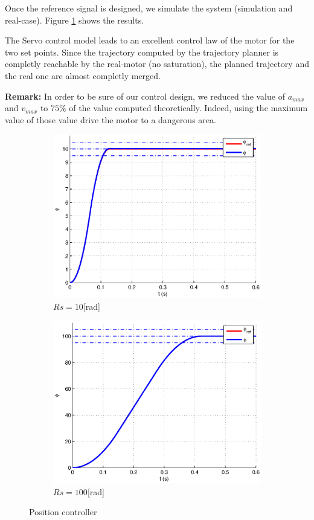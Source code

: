 Once the reference signal is designed, we simulate the system (simulation and real-case). Figure \ref{resultModelfollowing} shows the results.
 
The Servo control model leads to an excellent control law of the motor for the two set points. Since the trajectory computed by the trajectory planner is completly reachable by the real-motor (no saturation), the planned trajectory and the real one are almost completly merged.

\textbf{Remark:} In order to be sure of our control design, we reduced the value of $a_{max}$ and $v_{max}$ to $75\%$ of the value computed theoretically. Indeed, using the maximum value of those value drive the motor to a dangerous area.

\begin{figure}[ht]
  \centering
  \begin{subfigure}[b]{\linewidth}
   \includegraphics[width=\columnwidth]{fig/resultModelControl10.eps}
   \caption{$Rs = 10$[rad]}
  \end{subfigure}
  \begin{subfigure}[b]{\linewidth}
  \includegraphics[width=\columnwidth]{fig/resultModelControl100.eps}
   \caption{$Rs = 100$[rad]}
  \end{subfigure}

 \caption{Position controller}
 \label{resultModelfollowing}
\end{figure}



